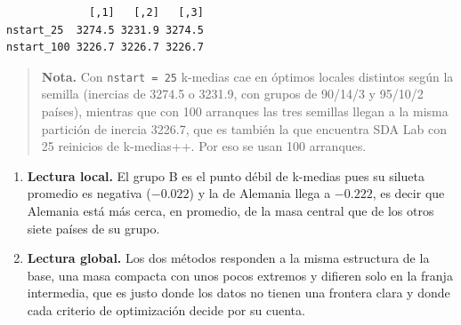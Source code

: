 \documentclass[oneside, openany, fontset=libertinus]{mitthesis}
\newenvironment{Shaded}{\begin{snugshade}}{\end{snugshade}}
\newcommand{\AttributeTok}[1]{\textcolor[rgb]{0.40,0.45,0.13}{#1}}
\newcommand{\CommentTok}[1]{\textcolor[rgb]{0.37,0.37,0.37}{#1}}
\newcommand{\DecValTok}[1]{\textcolor[rgb]{0.68,0.00,0.00}{#1}}
\newcommand{\FunctionTok}[1]{\textcolor[rgb]{0.28,0.35,0.67}{#1}}
\newcommand{\NormalTok}[1]{\textcolor[rgb]{0.00,0.23,0.31}{#1}}
\newcommand{\OtherTok}[1]{\textcolor[rgb]{0.00,0.23,0.31}{#1}}
\newcommand{\SpecialCharTok}[1]{\textcolor[rgb]{0.37,0.37,0.37}{#1}}
\newcommand{\StringTok}[1]{\textcolor[rgb]{0.13,0.47,0.30}{#1}}
\providecommand{\tightlist}{\setlength{\itemsep}{0pt}\setlength{\parskip}{0pt}}
\begin{document}
\begin{verbatim}
             [,1]   [,2]   [,3]
nstart_25  3274.5 3231.9 3274.5
nstart_100 3226.7 3226.7 3226.7
\end{verbatim}

\begin{quote}
\textbf{Nota.} Con \texttt{nstart\ =\ 25} k-medias cae en óptimos
locales distintos según la semilla (inercias de 3274.5 o 3231.9, con
grupos de 90/14/3 y 95/10/2 países), mientras que con 100 arranques las
tres semillas llegan a la misma partición de inercia 3226.7, que es
también la que encuentra SDA Lab con 25 reinicios de k-medias++. Por eso
se usan 100 arranques.
\end{quote}

\begin{enumerate}
\def\labelenumi{\alph{enumi}.}
\tightlist
\item
  \textbf{Lectura local.} El grupo B es el punto débil de k-medias pues
  su silueta promedio es negativa (\(-0.022\)) y la de Alemania llega a
  \(-0.222\), es decir que Alemania está más cerca, en promedio, de la
  masa central que de los otros siete países de su grupo.
\item
  \textbf{Lectura global.} Los dos métodos responden a la misma
  estructura de la base, una masa compacta con unos pocos extremos y
  difieren solo en la franja intermedia, que es justo donde los datos no
  tienen una frontera clara y donde cada criterio de optimización decide
  por su cuenta.
\end{enumerate}

\Needspace{4.18in}

\begin{Shaded}
\end{Shaded}
\end{document}
